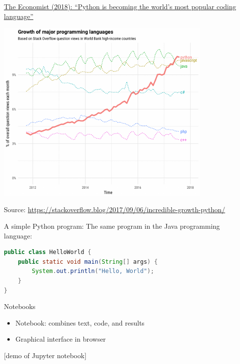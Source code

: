 \documentclass[aspectratio=169,usenames,dvipsnames]{beamer}
\begin{document}
\begin{frame}
	\begin{reference}
		\href{https://www.economist.com/graphic-detail/2018/07/26/python-is-becoming-the-worlds-most-popular-coding-language}{
			The Economist (2018): ``Python is becoming the world’s most popular coding language''}
	\end{reference}

    \centering
    \includegraphics[width=0.8\textwidth]{fig/pythongrowth.png}

    Source: \url{https://stackoverflow.blog/2017/09/06/incredible-growth-python/}
\end{frame}

\begin{frame}[fragile]
A simple Python program:
\vspace{1em}
The same program in the Java programming language:
\begin{lstlisting}[language=java]
public class HelloWorld {
    public static void main(String[] args) {
        System.out.println("Hello, World");
    }
}
\end{lstlisting}
\end{frame}


\begin{frame}{Notebooks}
\begin{itemize}
    \item Notebook: combines text, code, and results
    \item Graphical interface in browser
\end{itemize}

[demo of Jupyter notebook]
\end{frame}
\end{document}
